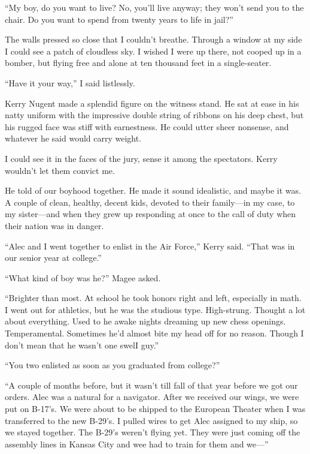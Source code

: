 \documentclass{novel}
\begin{document}
“My boy, do you want to live? No, you’ll live anyway; they won’t send you to the chair. Do you want to spend from twenty years to life in jail?”

The walls pressed so close that I couldn’t breathe. Through a window at my side I could see a patch of cloudless sky. I wished I were up there, not cooped up in a bomber, but flying free and alone at ten thousand feet in a single-seater.

“Have it your way,” I said listlessly.

\scenestars

Kerry Nugent made a splendid figure on the witness stand. He sat at ease in his natty uniform with the impressive double string of ribbons on his deep chest, but his rugged face was stiff with earnestness. He could utter sheer nonsense, and whatever he said would carry weight. 

I could see it in the faces of the jury, sense it among the spectators. Kerry wouldn’t let them convict me.

He told of our boyhood together. He made it sound idealistic, and maybe it was. A couple of clean, healthy, decent kids, devoted to their family—in my case, to my sister—and when they grew up responding at once to the call of duty when their nation was in danger.

“Alec and I went together to enlist in the Air Force,” Kerry said. “That was in our senior year at college.”

“What kind of boy was he?” Magee asked.

“Brighter than most. At school he took honors right and left, especially in math. I went out for athletics, but he was the studious type. High-strung. Thought a lot about everything. Used to he awake nights dreaming up new chess openings. Temperamental. Sometimes he’d almost bite my head off for no reason. Though I don’t mean that he wasn’t one swelI guy.”

“You two enlisted as soon as you graduated from college?”

“A couple of months before, but it wasn’t till fall of that year before we got our orders. Alec was a natural for a navigator. After we received our wings, we were put on B-17’s. We were about to be shipped to the European Theater when I was transferred to the new B-29’s. I pulled wires to get Alec assigned to my ship, so we stayed together. The B-29’s weren’t flying yet. They were just coming off the assembly lines in Kansas City and wee had to train for them and we—”
\end{document}

